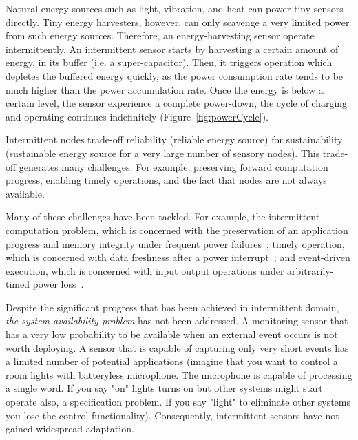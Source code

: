 Natural energy sources such as light, vibration, and heat can power tiny sensors directly. Tiny energy harvesters, however, can only scavenge a very limited power from such energy sources. Therefore, an energy-harvesting sensor operate intermittently. An intermittent sensor starts by harvesting a certain amount of energy, in its buffer (i.e. a super-capacitor). Then, it triggers operation which depletes the buffered energy quickly, as the power consumption rate tends to be much higher than the power accumulation rate. Once the energy is below a certain level, the sensor experience a complete power-down, the cycle of charging and operating continues indefinitely (Figure~\ref{fig:powerCycle}). 

Intermittent nodes trade-off reliability (reliable energy source) for sustainability (sustainable energy source for a very large number of sensory nodes). This trade-off generates many challenges. For example, preserving forward computation progress, enabling timely operations, and the fact that nodes are not always available. 
%

Many of these challenges have been tackled. For example, the intermittent computation problem, which is concerned with the preservation of an application progress and memory integrity under frequent power failures~\cite{mementos,dino,colin2016chain}; timely operation, which is concerned with data freshness after a power interrupt~\cite{hester2017timely}; and event-driven execution, which is concerned with input output operations under arbitrarily-timed power loss~\cite{yildirm2018ink}.%

Despite the significant progress that has been achieved in intermittent domain, \textit{the system availability problem} has not been addressed. A monitoring sensor that has a very low probability to be available when an external event occurs is not worth deploying. A sensor that is capable of capturing only very short events has a limited number of potential applications (imagine that you want to control a room lights with batteryless microphone. The microphone is capable of processing a single word. If you say "on" lights turns on but other systems might start operate also, a specification problem. If you say "light" to eliminate other systems you lose the control functionality). Consequently, intermittent sensors have not gained widespread adaptation. 

